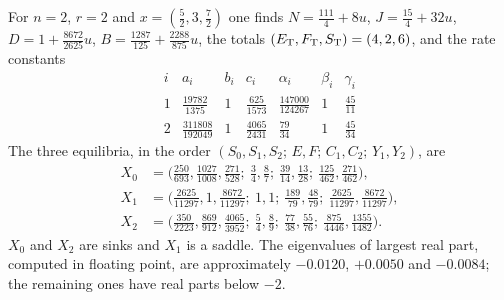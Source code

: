 \begin{example}\label{ex:two}
For \(n=2\), \(r=2\) and \(x=(\tfrac52,3,\tfrac72)\) one finds \(N=\tfrac{111}{4}+8u\),
\(J=\tfrac{15}{4}+32u\), \(D=1+\tfrac{8672}{2625}u\), \(B=\tfrac{1287}{125}+\tfrac{2288}{875}u\),
the totals \((E_{\mathrm T},F_{\mathrm T},S_{\mathrm T})=(4,2,6)\), and the rate constants
\[
\begin{array}{c|cccccc}
 i & a_i & b_i & c_i & \alpha_i & \beta_i & \gamma_i\\\hline
 1 & \tfrac{19782}{1375} & 1 & \tfrac{625}{1573} & \tfrac{147000}{124267} & 1 & \tfrac{45}{11}\\[3pt]
 2 & \tfrac{311808}{192049} & 1 & \tfrac{4065}{2431} & \tfrac{79}{34} & 1 & \tfrac{45}{34}
\end{array}
\]
The three equilibria, in the order \((S_0,S_1,S_2;\,E,F;\,C_1,C_2;\,Y_1,Y_2)\), are
\begin{align*}
 X_0&=\bigl(\tfrac{250}{693},\tfrac{1027}{1008},\tfrac{271}{528};\ \tfrac34,\tfrac87;\
 \tfrac{39}{14},\tfrac{13}{28};\ \tfrac{125}{462},\tfrac{271}{462}\bigr),\\
 X_1&=\bigl(\tfrac{2625}{11297},1,\tfrac{8672}{11297};\ 1,1;\
 \tfrac{189}{79},\tfrac{48}{79};\ \tfrac{2625}{11297},\tfrac{8672}{11297}\bigr),\\
 X_2&=\bigl(\tfrac{350}{2223},\tfrac{869}{912},\tfrac{4065}{3952};\ \tfrac54,\tfrac89;\
 \tfrac{77}{38},\tfrac{55}{76};\ \tfrac{875}{4446},\tfrac{1355}{1482}\bigr).
\end{align*}
\(X_0\) and \(X_2\) are sinks and \(X_1\) is a saddle. The eigenvalues of largest real part,
computed in floating point, are approximately \(-0.0120\), \(+0.0050\) and \(-0.0084\); the
remaining ones have real parts below \(-2\).
\end{example}

